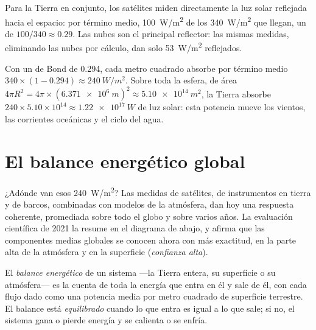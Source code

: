 Para la Tierra en conjunto, los satélites miden directamente la luz solar
reflejada hacia el espacio: por término medio, \qty{100}{W/m^2} de los
\qty{340}{W/m^2} que llegan, un  de $100/340 \approx 0.29$. Las nubes
son el principal reflector: las mismas medidas, eliminando las nubes por
cálculo, dan solo \qty{53}{W/m^2} reflejados.

\begin{example}\label{ex:g10:earth-energy-budget:absorbed}
Con un  de Bond de 0.294, cada metro cuadrado absorbe por término
medio $340
\times (1 - 0.294) \approx \qty{240}{W/m^2}$. Sobre toda la
esfera, de área
$4\pi R^2 = 4\pi \times (\qty{6.371e6}{m})^2 \approx \qty{5.10e14}{m^2}$, la
Tierra absorbe $240 \times 5.10\times10^{14} \approx \qty{1.22e17}{W}$ de luz
solar: esta potencia mueve los vientos, las corrientes oceánicas y el ciclo
del agua.
\end{example}

\section{El balance energético global}

¿Adónde van esos \qty{240}{W/m^2}? Las medidas de satélites, de
instrumentos en tierra y de barcos, combinadas con modelos de la atmósfera,
dan hoy una respuesta coherente, promediada sobre todo el globo y sobre
varios años. La evaluación científica de 2021 la resume en el diagrama de
abajo, y afirma que las componentes medias globales se conocen ahora con más
exactitud, en la parte alta de la atmósfera y en la superficie
(\emph{confianza alta}).

\begin{definition}\label{def:g10:earth-energy-budget:energy-budget}
El \emph{balance energético}
de un sistema ---la Tierra entera, su superficie o su atmósfera--- es la
cuenta de toda la energía que entra en él y sale de él, con cada flujo dado
como una potencia media por metro cuadrado de superficie terrestre. El
balance está \emph{equilibrado} cuando lo que entra es igual a lo que sale;
si no, el sistema gana o pierde energía y se calienta o se enfría.
\end{definition}

